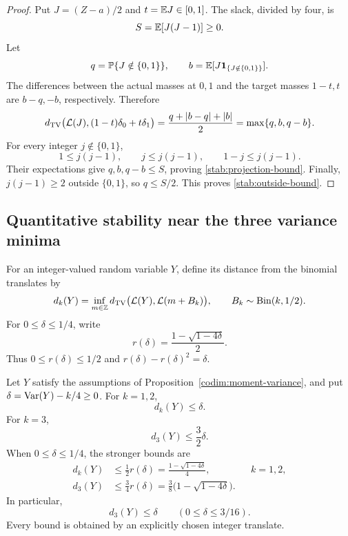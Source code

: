 \begin{proof}
Put \(J=(Z-a)/2\) and \(t=\mathbb E J\in[0,1]\).  The slack, divided
by four, is
\[
S=\mathbb E[J(J-1)]\ge0.
\]
Let
\[
q=\mathbb P\{J\notin\{0,1\}\},
\qquad
b=\mathbb E[J\mathbf 1_{\{J\notin\{0,1\}\}}].
\]
The differences between the actual masses at \(0,1\) and the target
masses \(1-t,t\) are \(b-q,-b\), respectively.  Therefore
\[
d_{\mathrm{TV}}\bigl(\mathcal L(J),(1-t)\delta_0+t\delta_1\bigr)
=\frac{q+|b-q|+|b|}{2}
=\max\{q,b,q-b\}.
\]
For every integer \(j\notin\{0,1\}\),
\[
1\le j(j-1),\qquad
j\le j(j-1),\qquad
1-j\le j(j-1).
\]
Their expectations give \(q,b,q-b\le S\), proving
\eqref{stab:projection-bound}.  Finally,
\(j(j-1)\ge2\) outside \(\{0,1\}\), so \(q\le S/2\).
This proves \eqref{stab:outside-bound}.
\end{proof}

\subsection{Quantitative stability near the three variance minima}

\begin{definition}
\label{stab:distance-definition}
For an integer-valued random variable \(Y\), define its distance from
the binomial translates by
\[
d_k(Y)=\inf_{m\in\mathbb Z}
d_{\mathrm{TV}}\bigl(\mathcal L(Y),\mathcal L(m+B_k)\bigr),
\qquad B_k\sim\operatorname{Bin}(k,1/2).
\]
For \(0\le\delta\le1/4\), write
\[
r(\delta)=\frac{1-\sqrt{1-4\delta}}2.
\]
Thus \(0\le r(\delta)\le1/2\) and
\(r(\delta)-r(\delta)^2=\delta\).
\end{definition}

\begin{theorem}
\label{stab:main}
Let \(Y\) satisfy the assumptions of
Proposition~\ref{codim:moment-variance}, and put
\(\delta=\operatorname{Var}(Y)-k/4\ge0\).  For \(k=1,2\),
\begin{equation}
\label{stab:global-twelve}
d_k(Y)\le\delta.
\end{equation}
For \(k=3\),
\begin{equation}
\label{stab:global-three}
d_3(Y)\le\frac32\delta.
\end{equation}
When \(0\le\delta\le1/4\), the stronger bounds are
\begin{align}
d_k(Y)&\le\frac12r(\delta)
=\frac{1-\sqrt{1-4\delta}}4,
&& k=1,2,
\label{stab:local-twelve}\\
d_3(Y)&\le\frac34r(\delta)
=\frac38\bigl(1-\sqrt{1-4\delta}\bigr).
\label{stab:local-three}
\end{align}
In particular,
\begin{equation}
\label{stab:small-three}
d_3(Y)\le\delta
\qquad(0\le\delta\le3/16).
\end{equation}
Every bound is obtained by an explicitly chosen integer translate.
\end{theorem}

